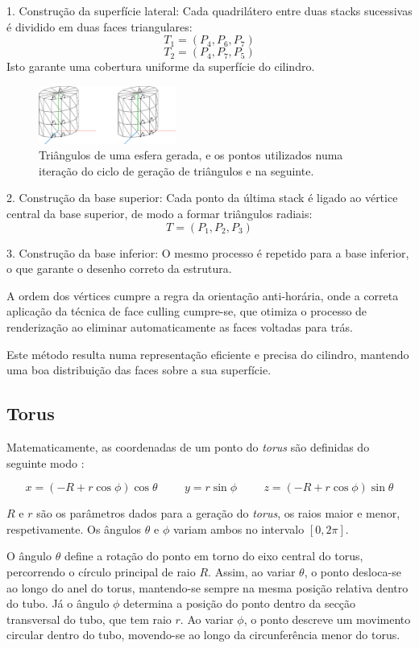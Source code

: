 \documentclass[12pt, a4paper]{article}
\begin{document}
1. Construção da superfície lateral:
Cada quadrilátero entre duas stacks sucessivas é dividido em duas faces triangulares:
\[
T_1 = (P_4, P_6, P_7)
\]
\[
T_2 = (P_4, P_7, P_5)
\]
Isto garante uma cobertura uniforme da superfície do cilindro.

\begin{figure}[H]
    \centering
    \includegraphics[width=0.4\textwidth]{res/figures/cylinder.pdf}
    \caption{
        Triângulos de uma esfera gerada, e os pontos utilizados numa iteração do ciclo de geração
        de triângulos e na seguinte.
    }
\end{figure}

2. Construção da base superior:
Cada ponto da última stack é ligado ao vértice central da base superior, de modo a formar
triângulos radiais:
\[
T = (P_1, P_2, P_3)
\]

3. Construção da base inferior:
O mesmo processo é repetido para a base inferior, o que garante o desenho correto da estrutura.

A ordem dos vértices cumpre a regra da orientação anti-horária, onde a correta
aplicação da técnica de face culling cumpre-se, que otimiza o processo de renderização
ao eliminar automaticamente as faces voltadas para trás.

Este método resulta numa representação eficiente e precisa do cilindro, mantendo uma boa
distribuição das faces sobre a sua superfície.

\subsection{Torus}

Matematicamente, as coordenadas de um ponto do \emph{torus} são definidas do seguinte modo
\cite{torus}:

$$
x = (-R + r \cos \phi) \cos \theta
\hspace{1cm}
y = r \sin \phi
\hspace{1cm}
z = (-R + r \cos \phi) \sin \theta
$$

$R$ e $r$ são os parâmetros dados para a geração do \emph{torus}, os raios maior e menor,
respetivamente. Os ângulos $\theta$ e $\phi$ variam ambos no intervalo $[0, 2\pi]$.

O ângulo $\theta$ define a rotação do ponto em torno do eixo central do torus, percorrendo o
círculo principal de raio $R$. Assim, ao variar $\theta$, o ponto desloca-se ao longo do anel do
torus, mantendo-se sempre na mesma posição relativa dentro do tubo. Já o ângulo $\phi$ determina a
posição do ponto dentro da secção transversal do tubo, que tem raio $r$. Ao variar $\phi$, o ponto
descreve um movimento circular dentro do tubo, movendo-se ao longo da circunferência menor do torus.
\end{document}
